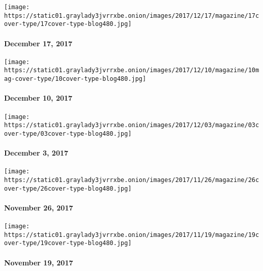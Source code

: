 \texttt{[image: https://static01.graylady3jvrrxbe.onion/images/2017/12/17/magazine/17cover-type/17cover-type-blog480.jpg]}

\hypertarget{december-17-2017}{%
\paragraph{December 17, 2017}\label{december-17-2017}}

\href{https://www.nytimes3xbfgragh.onion/interactive/2017/12/07/magazine/great-performers-horror-show.html}{}

\texttt{[image: https://static01.graylady3jvrrxbe.onion/images/2017/12/10/magazine/10mag-cover-type/10cover-type-blog480.jpg]}

\hypertarget{december-10-2017}{%
\paragraph{December 10, 2017}\label{december-10-2017}}

\href{https://www.nytimes3xbfgragh.onion/issue/magazine/2017/12/01/120317-issue}{}

\texttt{[image: https://static01.graylady3jvrrxbe.onion/images/2017/12/03/magazine/03cover-type/03cover-type-blog480.jpg]}

\hypertarget{december-3-2017}{%
\paragraph{December 3, 2017}\label{december-3-2017}}

\href{https://www.nytimes3xbfgragh.onion/issue/magazine/2017/11/27/112617-issue}{}

\texttt{[image: https://static01.graylady3jvrrxbe.onion/images/2017/11/26/magazine/26cover-type/26cover-type-blog480.jpg]}

\hypertarget{november-26-2017}{%
\paragraph{November 26, 2017}\label{november-26-2017}}

\href{https://www.nytimes3xbfgragh.onion/issue/magazine/2017/11/17/111917-issue}{}

\texttt{[image: https://static01.graylady3jvrrxbe.onion/images/2017/11/19/magazine/19cover-type/19cover-type-blog480.jpg]}

\hypertarget{november-19-2017}{%
\paragraph{November 19, 2017}\label{november-19-2017}}

